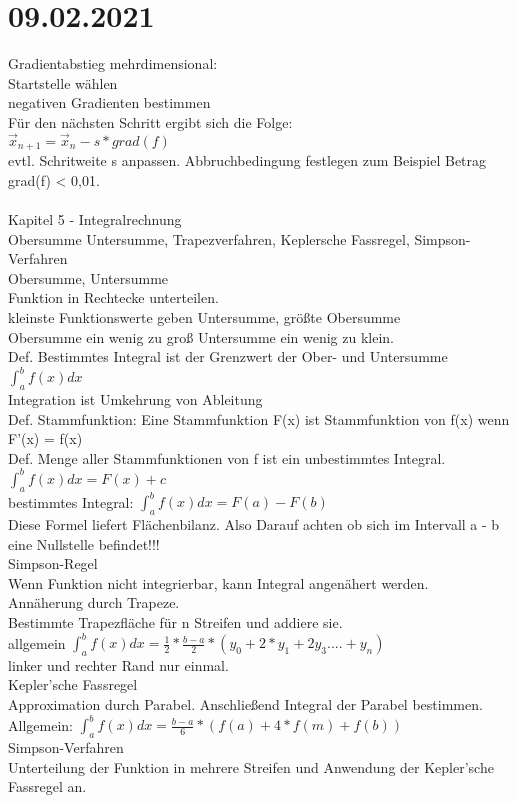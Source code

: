 \documentclass{article}
\begin{document}
	 \section*{09.02.2021}
	 Gradientabstieg mehrdimensional: \\
	 Startstelle wählen \\
	 negativen Gradienten bestimmen \\
	 Für den nächsten Schritt ergibt sich die Folge: \\
	 $\vec{x}_{n+1} = \vec{x}_n - s * grad(f)$ \\
	 evtl. Schritweite s anpassen. Abbruchbedingung festlegen zum Beispiel Betrag grad(f) < 0,01. \\
	 \\
	 Kapitel 5 - Integralrechnung \\
	 Obersumme Untersumme, Trapezverfahren, Keplersche Fassregel, Simpson-Verfahren \\
	 Obersumme, Untersumme \\
	 Funktion in Rechtecke unterteilen. \\
	 kleinste Funktionswerte geben Untersumme, größte Obersumme \\
	 Obersumme ein wenig zu groß Untersumme ein wenig zu klein. \\
	 Def. Bestimmtes Integral ist der Grenzwert der Ober- und Untersumme \\
	 $\int_{a}^{b}f(x)dx$ \\
	 Integration ist Umkehrung von Ableitung \\
	 Def. Stammfunktion: Eine Stammfunktion F(x) ist Stammfunktion von f(x) wenn F'(x) = f(x) \\
	 Def. Menge aller Stammfunktionen von f ist ein unbestimmtes Integral. \\
	 $\int_{a}^{b}f(x)dx = F(x) + c$ \\
	 bestimmtes Integral: $\int_{a}^{b}f(x)dx = F(a) - F(b)$ \\
	 Diese Formel liefert Flächenbilanz. Also Darauf achten ob sich im Intervall a - b eine Nullstelle befindet!!! \\
	 Simpson-Regel \\
	 Wenn Funktion nicht integrierbar, kann Integral angenähert werden. \\
	 Annäherung durch Trapeze. \\
	 Bestimmte Trapezfläche für n Streifen und addiere sie. \\
	 allgemein $\int_{a}^{b}f(x)dx = \frac{1}{2} * \frac{b - a}{2} * (y_0 + 2*y_1 + 2y_3.... +y_n)$ \\
	 linker und rechter Rand nur einmal. \\
	 Kepler'sche Fassregel \\
	 Approximation durch Parabel. Anschließend Integral der Parabel bestimmen. \\
	 Allgemein: $\int_{a}^{b}f(x)dx = \frac{b - a}{6} * (f(a) + 4*f(m)+f(b))$ \\
	 Simpson-Verfahren \\
	 Unterteilung der Funktion in mehrere Streifen und Anwendung der Kepler'sche Fassregel an. \\
	 
	 
\end{document}
